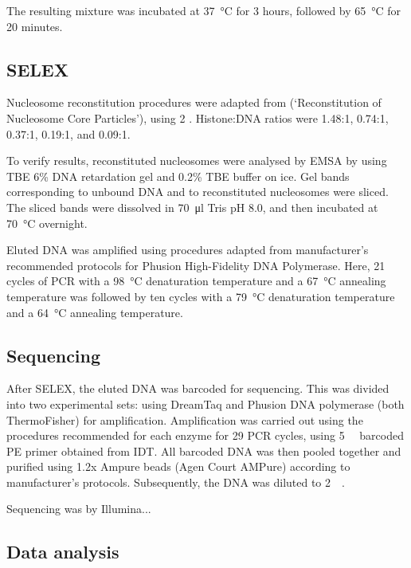 \documentclass[parskip=full, numbers=noenddot]{scrreprt}
\begin{document}
The resulting mixture was incubated at \SI{37}{\celsius} for 3 hours, followed by \SI{65}{\celsius} for 20 minutes.

\subsection{SELEX}
\label{ssec:emsaselex_methods_selex}

Nucleosome reconstitution procedures were adapted from \citet{dyer_reconstitution_2003} (`Reconstitution of Nucleosome Core Particles'), using \SI{2}{\Molar} .  Histone:DNA ratios were 1.48:1, 0.74:1, 0.37:1, 0.19:1, and 0.09:1. %

To verify results, reconstituted nucleosomes were analysed by EMSA by using TBE 6\% DNA retardation gel and 0.2\% TBE buffer on ice.  Gel bands corresponding to unbound DNA and to reconstituted nucleosomes were sliced.  The sliced bands were dissolved in \SI{70}{\micro\litre} Tris pH 8.0, and then incubated at \SI{70}{\celsius} overnight.

Eluted DNA was amplified using procedures adapted from manufacturer's recommended protocols for Phusion High-Fidelity DNA Polymerase.  Here, 21 cycles of PCR with a \SI{98}{\celsius} denaturation temperature and a \SI{67}{\celsius} annealing temperature was followed by ten cycles with a \SI{79}{\celsius} denaturation temperature and a \SI{64}{\celsius} annealing temperature.

\subsection{Sequencing}
\label{ssec:emsaselex_methods_seq}

After SELEX, the eluted DNA was barcoded for sequencing. This was divided into two experimental sets: using DreamTaq and Phusion DNA polymerase (both ThermoFisher) for amplification.  Amplification was carried out using the procedures recommended for each enzyme for 29 PCR cycles, using \SI{5}{\micro\Molar} barcoded PE primer obtained from IDT.  All barcoded DNA was then pooled together and purified using 1.2x Ampure beads (Agen Court AMPure) according to manufacturer's protocols.  Subsequently, the DNA was diluted to \SI{2}{\nano\Molar}.

Sequencing was by Illumina... %

\subsection{Data analysis}
\label{ssec:emsaselex_methods_anal}
\end{document}
